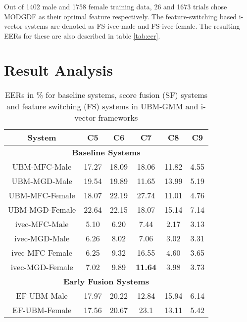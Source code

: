 \documentclass{article}
\begin{document}
Out of 1402 male and 1758 female training data, 26 and 1673
trials chose MODGDF as their optimal feature respectively.
The feature-switching based i-vector systems are denoted as 
FS-ivec-male and FS-ivec-female. The resulting EERs for these are also described in table \ref{tab:eer}.

\section{Result Analysis}
\label{sec:resAnalysis}

\begin{table}[h]
	\centering
	\caption{EERs in \% for baseline systems, score fusion (SF) systems and feature switching (FS) systems in UBM-GMM and i-vector frameworks}
	\begin{tabular}{|c|c|c|c|c|c|} \hline
 {\bf System} & {\bf C5 } &  {\bf C6} & {\bf C7} & {\bf C8}  & {\bf C9  }\\ \hline \hline
\multicolumn{6}{|c|}{\bf Baseline Systems} \\ \hline
UBM-MFC-Male & 17.27 & 18.09 & 18.06 & 11.82 & 4.55 \\ \hline

UBM-MGD-Male & 19.54 & 19.89 & 11.65 & 13.99 & 5.19 \\ \hline

{UBM-MFC-Female} & 18.07 & 22.19 & 27.74 & 11.01 & 4.76 \\ \hline

{UBM-MGD-Female} & 22.64 & 22.15 & 18.07 & 15.14 & 7.14 \\ \hline

{ivec-MFC-Male} & 5.10 & 6.20 & 7.44 & 2.17 & 3.13 \\ \hline

{ivec-MGD-Male} &  6.26 & 8.02 & 7.06 & 3.02 & 3.31  \\ \hline

{ivec-MFC-Female} & 6.25 & 9.32 & 16.55 & 4.60 & 3.65 \\ \hline

{ivec-MGD-Female} & 7.02 & 9.89 & {\bf 11.64} & 3.98 & 3.73 \\ \hline 

\multicolumn{6}{|c|}{\bf Early Fusion Systems} \\ \hline

{EF-UBM-Male} & 17.97 & 20.22 & 12.84 & 15.94 & 6.14\\ \hline

{EF-UBM-Female} & 17.56 & 20.67  & 23.1  & 13.11 & 5.42  \\ \hline


\end{tabular}
\end{table}
\end{document}
